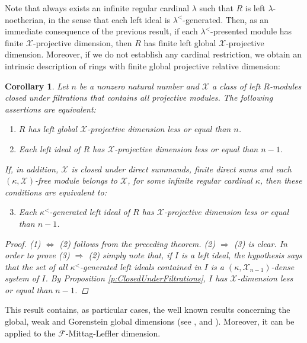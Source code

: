 \documentclass[a4paper,10pt]{amsart}
\newtheorem{corollary}[definition]{Corollary}
\begin{document}
Note that always exists an infinite regular cardinal $\lambda$ such
that $R$ is left $\lambda$-noetherian, in the sense that each left
ideal is $\lambda^<$-generated. Then, as an immediate consequence of
the previous result, if each $\lambda^<$-presented module has finite
$\mathcal X$-projective dimension, then $R$ has finite left global
$\mathcal X$-projective dimension. Moreover, if we do not establish any cardinal restriction, we obtain an intrinsic
description of rings with finite global projective relative dimension:

\begin{corollary}\label{c:GlobalDimensionIdeal}
  Let $n$ be a nonzero natural number and $\mathcal X$ a class of left
  $R$-modules closed under filtrations that contains all projective
  modules. The following assertions are equivalent:
  \begin{enumerate}
  \item $R$ has left global $\mathcal X$-projective dimension less or
    equal than $n$.

  \item Each left ideal of $R$ has $\mathcal X$-projective dimension
    less or equal than $n-1$.
  \end{enumerate}

  If, in addition, $\mathcal X$ is closed under direct summands,
  finite direct sums and each $(\kappa,\mathcal X)$-free module
  belongs to $\mathcal X$, for some infinite regular cardinal $\kappa$, then these
  conditions are equivalent to:

\begin{enumerate}
  \setcounter{enumi}{2}
\item Each $\kappa^<$-generated left ideal of $R$ has $\mathcal
  X$-projective dimension less or equal than $n-1$.
\end{enumerate}

\begin{proof}
  (1) $\Leftrightarrow$ (2) follows from the preceding theorem. (2)
  $\Rightarrow$ (3) is clear. In order to prove (3) $\Rightarrow$ (2)
  simply note that, if $I$ is a left ideal, the hypothesis says that
  the set of all $\kappa^<$-generated left ideals contained in $I$ is
  a $(\kappa,\mathcal X_{n-1})$-dense system of $I$. By Proposition
  \ref{p:ClosedUnderFiltrations}, $I$ has $\mathcal X$-dimension less
  or equal than $n-1$.
\end{proof}
\end{corollary}

This result contains, as particular cases, the well known results
concerning the global, weak and Gorenstein global dimensions (see
\cite[Theorem 8.16]{Rotman}, \cite[Theorem 8.25]{Rotman} and
\cite[Proposition 3.5]{EnochsIacobJenda}). Moreover, it can be applied
to the $\mathcal F$-Mittag-Leffler dimension.
\end{document}
